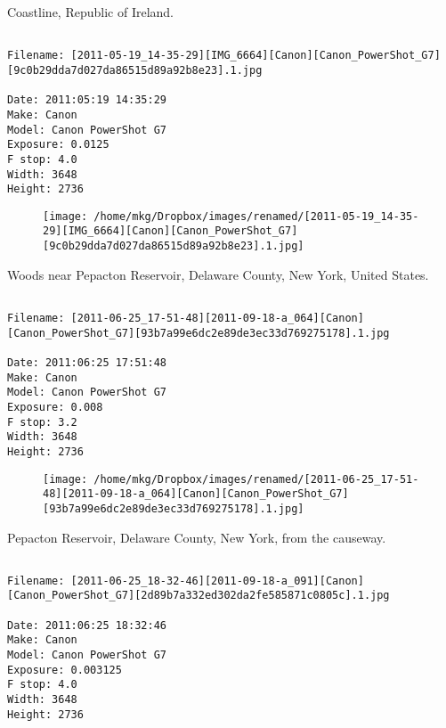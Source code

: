 \clearpage
\onecolumn
\noindent Coastline, Republic of Ireland.
\noindent
\begin{lstlisting}

Filename: [2011-05-19_14-35-29][IMG_6664][Canon][Canon_PowerShot_G7][9c0b29dda7d027da86515d89a92b8e23].1.jpg

Date: 2011:05:19 14:35:29
Make: Canon
Model: Canon PowerShot G7
Exposure: 0.0125
F stop: 4.0
Width: 3648
Height: 2736
\end{lstlisting}
\clearpage

\begin{figure}
\texttt{[image: /home/mkg/Dropbox/images/renamed/[2011-05-19\_14-35-29][IMG\_6664][Canon][Canon\_PowerShot\_G7][9c0b29dda7d027da86515d89a92b8e23].1.jpg]}
\end{figure}
    
\clearpage
\onecolumn
\noindent Woods near Pepacton Reservoir, Delaware County, New York, United States.
\noindent
\begin{lstlisting}

Filename: [2011-06-25_17-51-48][2011-09-18-a_064][Canon][Canon_PowerShot_G7][93b7a99e6dc2e89de3ec33d769275178].1.jpg

Date: 2011:06:25 17:51:48
Make: Canon
Model: Canon PowerShot G7
Exposure: 0.008
F stop: 3.2
Width: 3648
Height: 2736
\end{lstlisting}
\clearpage

\begin{figure}
\texttt{[image: /home/mkg/Dropbox/images/renamed/[2011-06-25\_17-51-48][2011-09-18-a\_064][Canon][Canon\_PowerShot\_G7][93b7a99e6dc2e89de3ec33d769275178].1.jpg]}
\end{figure}
    
\clearpage
\onecolumn
\noindent Pepacton Reservoir, Delaware County, New York, from the causeway.
\noindent
\begin{lstlisting}

Filename: [2011-06-25_18-32-46][2011-09-18-a_091][Canon][Canon_PowerShot_G7][2d89b7a332ed302da2fe585871c0805c].1.jpg

Date: 2011:06:25 18:32:46
Make: Canon
Model: Canon PowerShot G7
Exposure: 0.003125
F stop: 4.0
Width: 3648
Height: 2736
\end{lstlisting}
\clearpage


